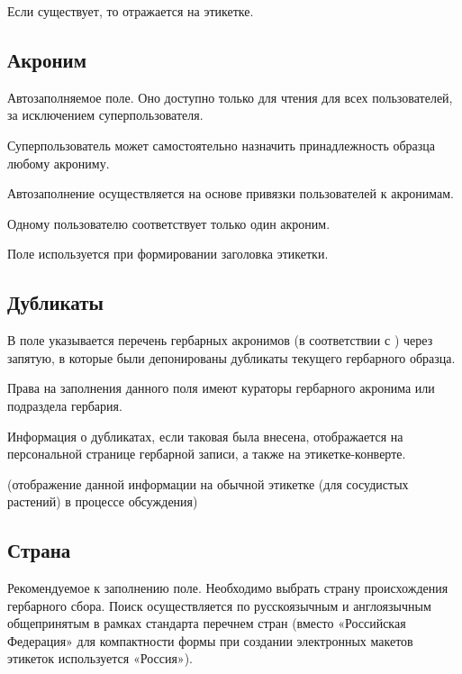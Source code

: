 \documentclass[letterpaper,10pt,russian]{sphinxmanual}
\begin{document}
Если существует, то отражается на этикетке.

\ignorespaces 

\subsection{Акроним}
\label{\detokenize{main:id21}}\label{\detokenize{main:index-16}}
Автозаполняемое поле. Оно доступно только для чтения для всех пользователей,
за исключением суперпользователя.

Суперпользователь может самостоятельно назначить
принадлежность образца любому акрониму.

Автозаполнение осуществляется на основе привязки пользователей к акронимам.

Одному пользователю соответствует только один акроним.

Поле используется при формировании заголовка этикетки.

\ignorespaces 

\subsection{Дубликаты}
\label{\detokenize{main:index-17}}\label{\detokenize{main:id22}}
В поле указывается перечень гербарных акронимов (в соответствии с )
через запятую, в которые были депонированы дубликаты текущего гербарного образца.

Права на заполнения данного поля имеют кураторы гербарного акронима или подраздела гербария.

Информация о дубликатах, если таковая была внесена, отображается на персональной странице
гербарной записи, а также на этикетке-конверте.

(отображение данной информации на обычной этикетке (для сосудистых растений)
в процессе обсуждения)

\ignorespaces 

\subsection{Страна}
\label{\detokenize{main:id23}}\label{\detokenize{main:index-18}}
Рекомендуемое к заполнению поле. Необходимо выбрать страну происхождения гербарного сбора.
Поиск осуществляется по русскоязычным и англоязычным общепринятым в рамках стандарта
 перечнем стран (вместо «Российская Федерация» для компактности формы при
создании электронных макетов этикеток  используется «Россия»).
\end{document}
